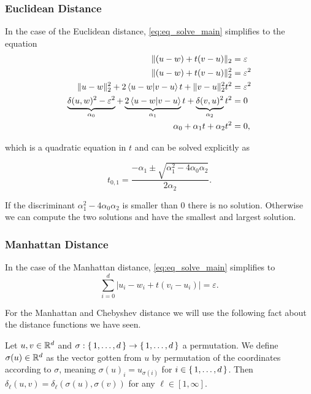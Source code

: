 \subsubsection{Euclidean Distance}
\label{subsubsec:eq_euclidean_distance}
In the case of the Euclidean distance, \cref{eq:eq_solve_main} simplifies to the equation 
\begin{align*}
  \| (u - w) + t(v - u) \|_2 &= \varepsilon \\
  \| (u - w) + t(v - u) \|_2^2 &= \varepsilon^2 \\
  \| u - w \|_2^2 + 2\braket{u - w | v - u} t  +  \| v - u \|_2^2 t^2 &= \varepsilon^2 \\
  \underbrace{\delta(u,w)^2 - \varepsilon^2}_{\alpha_0} + \underbrace{2\braket{u - w | v - u} }_{\alpha_1}t  +  \underbrace{\delta(v, u)^2}_{\alpha_2} t^2 &= 0 \\
  \alpha_0 + \alpha_1 t  + \alpha_2 t^2 &= 0,
\end{align*}

which is a quadratic equation in \(t\) and can be solved explicitly as 

\begin{equation}
  t_{0,1} = \frac{-\alpha_1 \pm \sqrt{\alpha_1^2 - 4\alpha_0\alpha_2}}{2\alpha_2}.\label{eq:sol_explicit_euclidean}
\end{equation}

If the discriminant \(\alpha_1^2 - 4\alpha_0\alpha_2\) is smaller than \(0\) there is no solution. Otherwise we can compute the two solutions and have the smallest and largest solution. 


\subsubsection{Manhattan Distance}
\label{subsubsec:eq_manhattan_distance}
In the case of the Manhattan distance, \cref{eq:eq_solve_main} simplifies to 
\begin{equation}
  \sum_{i=0}^d |u_i - w_i + t (v_i - u_i)| = \varepsilon. \label{eq:solve_manhattan}
\end{equation}

For the Manhattan and Chebyshev distance we will use the following fact about the distance functions we have seen. 
\begin{observation}\label{obs:permute-coordinates}
  Let \(u, v \in \mathbb{R}^d\) and \(\sigma: \set{1, \dots, d} \to \set{1, \dots, d}\) a permutation. We define \(\sigma(u) \in \mathbb{R}^d\) as the vector gotten from \(u\) by permutation of the coordinates according to \(\sigma\), meaning \(\sigma(u)_i = u_{\sigma(i)}\) for \(i \in \set{1, \dots, d}\). Then \(\delta_\ell(u, v) = \delta_\ell(\sigma(u), \sigma(v))\) for any \(\ell \in [1, \infty]\).
\end{observation}

